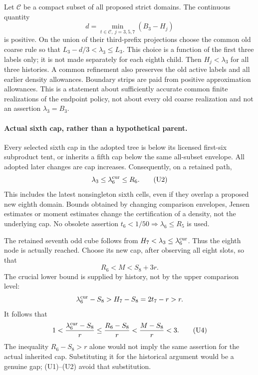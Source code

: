 Let $\mathcal C$ be a compact subset of all proposed strict domains.
The continuous quantity
\[
 d=\min_{t\in\mathcal C,\ j=3,5,7}(B_3-H_j)
\]
is positive. On the union of their third-prefix projections choose
the common old coarse rule so that
$L_3-d/3<\lambda_3\le L_3$. This choice is a function of the first
three labels only; it is not made separately for each eighth child.
Then $H_j<\lambda_3$ for all three histories. A common refinement
also preserves the old active labels and all earlier density
allowances. Boundary strips are paid from positive approximation
allowances. This is a statement about sufficiently accurate common
finite realizations of the endpoint policy, not about every old
coarse realization and not an assertion $\lambda_3=B_3$.

\paragraph{Actual sixth cap, rather than a hypothetical parent.}
Every selected sixth cap in the adopted tree is below its licensed
first-six subproduct tent, or inherits a fifth cap below the same
all-subset envelope. All adopted later changes are cap increases.
Consequently, on a retained path,
\[
 \lambda_3\le\lambda_6^{\rm cur}\le R_6.                 \tag{U2}
\]
This includes the latest nonsingleton sixth cells, even if they
overlap a proposed new eighth domain. Bounds obtained by changing
comparison envelopes, Jensen estimates or moment estimates change
the certification of a density, not the underlying cap. No obsolete
assertion $t_6<1/50\Rightarrow\lambda_6\le R_5$ is used.

The retained seventh odd cube follows from
$H_7<\lambda_3\le\lambda_6^{\rm cur}$. Thus the eighth node is
actually reached. Choose its new cap, after observing all eight
slots, so that
\[
 R_6<M<S_8+3r.                                         \tag{U3}
\]
The crucial lower bound is supplied by history, not by the upper
comparison level:
\[
 \lambda_6^{\rm cur}-S_8>H_7-S_8=2t_7-r>r.
\]
It follows that
\[
 1<\frac{\lambda_6^{\rm cur}-S_8}{r}
 \le\frac{R_6-S_8}{r}<\frac{M-S_8}{r}<3.               \tag{U4}
\]
The inequality $R_6-S_8>r$ alone would not imply the same assertion
for the actual inherited cap. Substituting it for the historical
argument would be a genuine gap; (U1)--(U2) avoid that substitution.


